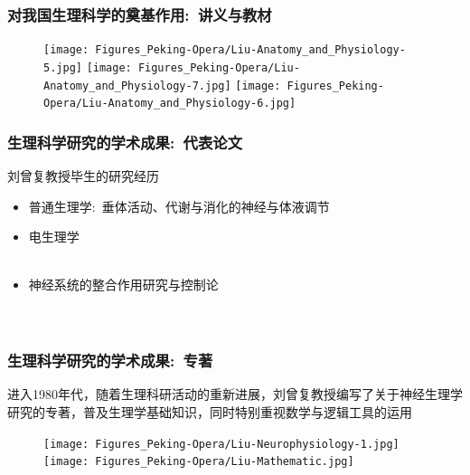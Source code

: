 \frame
{
	\frametitle{对我国生理科学的奠基作用:~讲义与教材}
\begin{figure}[h!] 
\centering
\vspace{-0.05in}
\texttt{[image: Figures\_Peking-Opera/Liu-Anatomy\_and\_Physiology-5.jpg]}
\texttt{[image: Figures\_Peking-Opera/Liu-Anatomy\_and\_Physiology-7.jpg]}
\texttt{[image: Figures\_Peking-Opera/Liu-Anatomy\_and\_Physiology-6.jpg]}
\label{Liu-Anatomy_and_Physiology-college}
\end{figure}
}

\frame
{
	\frametitle{生理科学研究的学术成果:~代表论文}
	刘曾复教授毕生的研究经历
	\begin{itemize}
		\item 普通生理学:~垂体活动、代谢与消化的神经与体液调节\\
			{\fontsize{6.2pt}{4.2pt}}
		\item 电生理学\\
			{\fontsize{6.2pt}{4.2pt}}\\
		\item 神经系统的整合作用研究与控制论\\ 
			{\fontsize{6.2pt}{4.2pt}}\\
			{\fontsize{6.2pt}{4.2pt}}\\
			{\fontsize{6.2pt}{4.2pt}}
	\end{itemize}
}

\frame
{
	\frametitle{生理科学研究的学术成果:~专著}
	进入1980年代，随着生理科研活动的重新进展，刘曾复教授编写了关于神经生理学研究的专著，普及生理学基础知识，同时特别重视数学与逻辑工具的运用
\begin{figure}[h!] 
\centering
\vspace{-0.05in}
\texttt{[image: Figures\_Peking-Opera/Liu-Neurophysiology-1.jpg]}
\texttt{[image: Figures\_Peking-Opera/Liu-Mathematic.jpg]}
\label{Liu-Anatomy_and_Physiology-college}
\end{figure}
}

